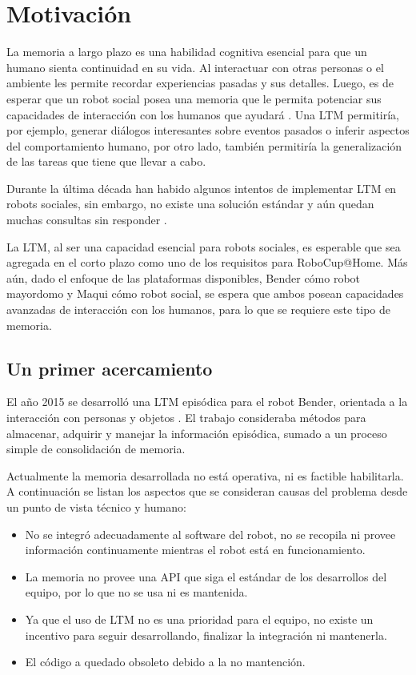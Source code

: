\section{Motivación}

La memoria a largo plazo es una habilidad cognitiva esencial para que un humano sienta continuidad en su vida. Al interactuar con otras personas o el ambiente les permite recordar experiencias pasadas y sus detalles. Luego, es de esperar que un robot social posea una memoria que le permita potenciar sus capacidades de interacción con los humanos que ayudará \cite{Vijayakumar2014}. Una LTM permitiría, por ejemplo, generar diálogos interesantes sobre eventos pasados o inferir aspectos del comportamiento humano, por otro lado, también permitiría la generalización de las tareas que tiene que llevar a cabo.

Durante la última década han habido algunos intentos de implementar LTM en robots sociales, sin embargo, no existe una solución estándar y aún quedan muchas consultas sin responder \cite{ltm_in_robocup}.

La LTM, al ser una capacidad esencial para robots sociales, es esperable que sea agregada en el corto plazo como uno de los requisitos para RoboCup@Home. Más aún, dado el enfoque de las plataformas disponibles, Bender cómo robot mayordomo y Maqui cómo robot social, se espera que ambos posean capacidades avanzadas de interacción con los humanos, para lo que se requiere este tipo de memoria.


\subsection{Un primer acercamiento}\label{sec:primer_acercamiento}

El año 2015 se desarrolló una LTM episódica para el robot Bender, orientada a la interacción con personas y objetos \cite{Sanchez:2015}. El trabajo consideraba métodos para almacenar, adquirir y manejar la información episódica, sumado a un proceso simple de consolidación de memoria.

Actualmente la memoria desarrollada no está operativa, ni es factible habilitarla. A continuación se listan los aspectos que se consideran causas del problema desde un punto de vista técnico y humano:
\begin{itemize}
	\item No se integró adecuadamente al software del robot, no se recopila ni provee información continuamente mientras el robot está en funcionamiento.
	\item La memoria no provee una API que siga el estándar de los desarrollos del equipo, por lo que no se usa ni es mantenida.
	\item Ya que el uso de LTM no es una prioridad para el equipo, no existe un incentivo para seguir desarrollando, finalizar la integración ni mantenerla. 
	\item El código a quedado obsoleto debido a la no mantención.
\end{itemize}

